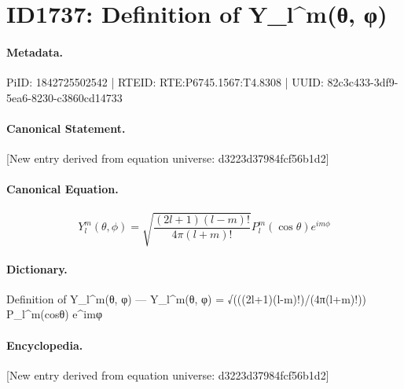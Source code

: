 \section*{ID1737: Definition of Y\_l\textasciicircum{}m(θ, φ)}
\paragraph{Metadata.}
PiID: 1842725502542 | RTEID: RTE:P6745.1567:T4.8308 | UUID: 82c3c433-3df9-5ea6-8230-c3860cd14733

\paragraph{Canonical Statement.}
[New entry derived from equation universe: d3223d37984fcf56b1d2]

\paragraph{Canonical Equation.}
\[
\begin{equation} Y_l^m(\theta, \phi) = \sqrt{\frac{(2l+1)(l-m)!}{4\pi(l+m)!}} P_l^m(\cos\theta) e^{im\phi} \end{equation}
\]

\paragraph{Dictionary.}
Definition of Y\_l\textasciicircum{}m(θ, φ) — Y\_l\textasciicircum{}m(θ, φ) = √(((2l+1)(l-m)!)/(4π(l+m)!)) P\_l\textasciicircum{}m(cosθ) e\textasciicircum{}imφ

\paragraph{Encyclopedia.}
[New entry derived from equation universe: d3223d37984fcf56b1d2]
